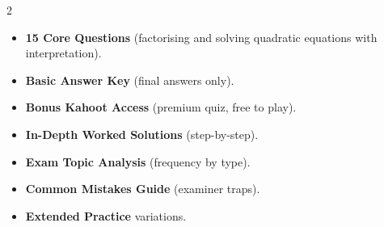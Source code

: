 \documentclass[11pt,a4paper]{article}
\newcommand{\FullReleaseDate}{April 30, 2026}
\begin{document}
\vspace{8pt}

\begin{multicols}{2}
  \begin{tcolorbox}[card, title=\sffamily\bfseries\textcolor{white}{\faHandPointDown\ TODAY (Simplified Version)}, colbacktitle=mainblue, boxed title style={sharp corners, boxrule=0pt}]
    \begin{itemize}[leftmargin=1.2em, itemsep=2pt]
      \item \small \textbf{15 Core Questions} (factorising and solving quadratic equations with interpretation).
      \item \small \textbf{Basic Answer Key} (final answers only).
      \item \small \textbf{Bonus Kahoot Access} (premium quiz, free to play).
    \end{itemize}
  \end{tcolorbox}

  \columnbreak

  \begin{tcolorbox}[card, title=\sffamily\bfseries\textcolor{white}{\faRocket\ ON \FullReleaseDate\ (Full Upgrade)}, colbacktitle=mainblue, boxed title style={sharp corners, boxrule=0pt}]
    \begin{itemize}[leftmargin=1.2em, itemsep=2pt]
      \item \small \textbf{In-Depth Worked Solutions} (step-by-step).
      \item \small \textbf{Exam Topic Analysis} (frequency by type).
      \item \small \textbf{Common Mistakes Guide} (examiner traps).
      \item \small \textbf{Extended Practice} variations.
    \end{itemize}
  \end{tcolorbox}
\end{multicols}
\end{document}
